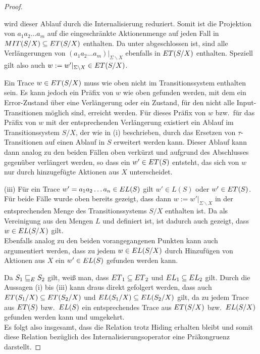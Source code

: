 \begin{proof}
\begin{itemize}
      wird dieser Ablauf durch die Internalisierung reduziert. Somit ist die
      Projektion von $a_1a_2\dots a_m$ auf die eingeschränkte Aktionenmenge auf
      jeden Fall in $MIT{}(S/X)\subseteq ET{}(S/X)$ enthalten. Da \ET{} unter
      \cont{} abgeschlossen ist, sind alle Verlängerungen von $(a_1a_2\dots
      a_m)|_{\Sigma \backslash X}$ ebenfalls in $ET{}(S/X)$ enthalten.
      Speziell gilt also auch $w:=w'|_{\Sigma\backslash X}\in ET{}(S/X)$.
  \end{itemize}
  Ein Trace $w\in ET{}(S/X)$ muss wie oben nicht im Transitionssystem
  enthalten sein. Es kann jedoch ein Präfix von $w$ wie oben gefunden werden,
  mit dem ein Error-Zustand über eine Verlängerung oder ein Zustand, für den
  nicht alle Input-Transitionen möglich sind, erreicht werden. Für dieses
  Präfix von $w$ bzw.\ für das Präfix von $w$ mit der entsprechenden
  Verlängerung existiert ein Ablauf im Transitionssystem $S/X$, der wie in (i)
  beschrieben, durch das Ersetzen von $\tau$-Transitionen auf einen Ablauf in
  $S$ erweitert werden kann. Dieser Ablauf kann dann analog zu den beiden
  Fällen oben verkürzt und aufgrund des Abschlusses gegenüber \cont{}
  verlängert werden, so dass ein $w'\in ET{}(S)$ entsteht, das sich von $w$
  nur durch hinzugefügte Aktionen aus $X$ unterscheidet.

  (iii)
  Für ein Trace $w'=a_1a_2\dots a_n\in EL{}(S)$ gilt $w'\in L(S)$ oder $w'\in
  ET{}(S)$. Für beide Fälle wurde oben bereits gezeigt, dass dann
  $w:=w'|_{\Sigma\backslash X}$ in der entsprechenden Menge des
  Transitionssystems $S/X$ enthalten ist. Da \EL{} als Vereinigung aus den
  Mengen $L$ und \ET{} definiert ist, ist dadurch auch gezeigt, dass
  $w\in EL{}(S/X)$ gilt.\\
  Ebenfalls analog zu den beiden vorangegangenen Punkten kann auch argumentiert
  werden, dass zu jedem $w\in EL{}(S/X)$ durch Hinzufügen von Aktionen aus $X$
  ein $w'\in EL{}(S)$ gefunden werden kann.

  Da $S_1\sqsubseteq _E S_2$ gilt, weiß man, dass $ET{}_1\subseteq ET{}_2$ und
  $EL{}_1\subseteq EL{}_2$ gilt. Durch die Aussagen (i) bis (iii) kann draus
  direkt gefolgert werden, dass auch $ET{}(S_1/X)\subseteq ET{}(S_2/X)$ und
  $EL{}(S_1/X)\subseteq EL{}(S_2/X)$ gilt, da zu jedem Trace aus $ET(S)$
  bzw.\ $EL{}(S)$ ein entsprechendes Trace aus $ET(S/X)$ bzw.\ $EL{}(S/X)$
  gefunden werden kann und umgekehrt.\\
  Es folgt also insgesamt, dass die Relation \ERel{} trotz Hiding erhalten
  bleibt und somit diese Relation bezüglich des Internalisierungsoperator eine
  Präkongruenz darstellt.
\end{proof}

